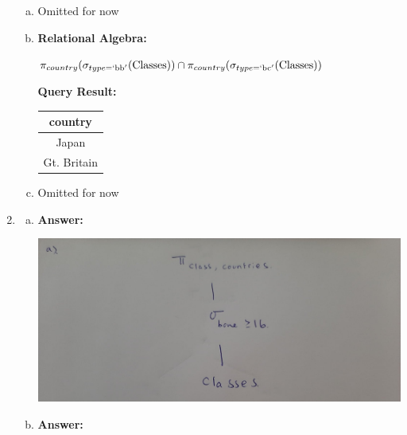 \documentclass[12pt]{article}
\begin{document}
\begin{enumerate}
\begin{enumerate}[a)]
        \item Omitted for now

        \item

        \textbf{Relational Algebra:}

        \bigskip

        $\pi_{country}(\sigma_{type = `\text{bb}'} (\text{Classes})) \cap \pi_{country}(\sigma_{type = `\text{bc}'}(\text{Classes}))$

        \bigskip

        \textbf{Query Result:}

        \bigskip

        \begin{tabular}{|c|}
            \hline
            country\\
            \hline
            Japan\\
            \hline
            Gt. Britain\\
            \hline
        \end{tabular}

        \item Omitted for now

    \end{enumerate}

    \item

    \begin{enumerate}[a)]
        \item

        \textbf{Answer:}

        \bigskip

        \begin{center}
        \includegraphics[width=0.7\linewidth]{images/worksheet_2_solution_17.jpg}
        \end{center}

        \item

        \textbf{Answer:}

        \bigskip


\end{enumerate}
\end{enumerate}
\end{document}
